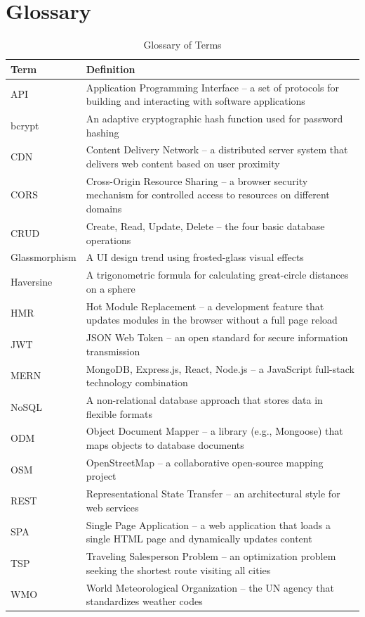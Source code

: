 \section{Glossary}
\begin{table}[H]
    \centering
    \renewcommand{\arraystretch}{1.3}
    \small
    \begin{tabular}{|p{3.5cm}|p{9.5cm}|}
        \hline
        \textbf{Term} & \textbf{Definition} \\
        \hline
        API & Application Programming Interface -- a set of protocols for building and interacting with software applications \\
        \hline
        bcrypt & An adaptive cryptographic hash function used for password hashing \\
        \hline
        CDN & Content Delivery Network -- a distributed server system that delivers web content based on user proximity \\
        \hline
        CORS & Cross-Origin Resource Sharing -- a browser security mechanism for controlled access to resources on different domains \\
        \hline
        CRUD & Create, Read, Update, Delete -- the four basic database operations \\
        \hline
        Glassmorphism & A UI design trend using frosted-glass visual effects \\
        \hline
        Haversine & A trigonometric formula for calculating great-circle distances on a sphere \\
        \hline
        HMR & Hot Module Replacement -- a development feature that updates modules in the browser without a full page reload \\
        \hline
        JWT & JSON Web Token -- an open standard for secure information transmission \\
        \hline
        MERN & MongoDB, Express.js, React, Node.js -- a JavaScript full-stack technology combination \\
        \hline
        NoSQL & A non-relational database approach that stores data in flexible formats \\
        \hline
        ODM & Object Document Mapper -- a library (e.g., Mongoose) that maps objects to database documents \\
        \hline
        OSM & OpenStreetMap -- a collaborative open-source mapping project \\
        \hline
        REST & Representational State Transfer -- an architectural style for web services \\
        \hline
        SPA & Single Page Application -- a web application that loads a single HTML page and dynamically updates content \\
        \hline
        TSP & Traveling Salesperson Problem -- an optimization problem seeking the shortest route visiting all cities \\
        \hline
        WMO & World Meteorological Organization -- the UN agency that standardizes weather codes \\
        \hline
    \end{tabular}
    \caption{Glossary of Terms}
    \label{tab:glossary}
\end{table}